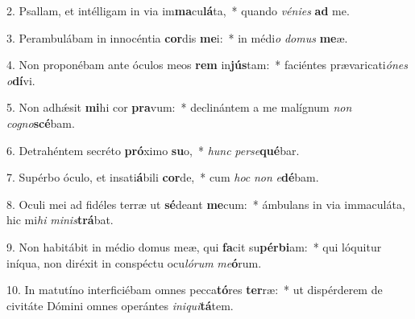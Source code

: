 2. Psallam, et intélligam in via im\textbf{ma}cu\textbf{lá}ta,~*  quando \textit{vé}\textit{ni}\textit{es} \textbf{ad} me.\

3. Perambulábam in innocéntia \textbf{cor}dis \textbf{me}i:~*  in médi\textit{o} \textit{do}\textit{mus} \textbf{me}æ.\

4. Non proponébam ante óculos meos \textbf{rem} in\textbf{jús}tam:~*  faciéntes prævaricati\textit{ó}\textit{nes} \textit{o}\textbf{dí}vi.\

5. Non adhǽsit \textbf{mi}hi cor \textbf{pra}vum:~*  declinántem a me malígnum \textit{non} \textit{co}\textit{gno}\textbf{scé}bam.\

6. Detrahéntem secréto \textbf{pró}ximo \textbf{su}o,~*  \textit{hunc} \textit{per}\textit{se}\textbf{qué}bar.\

7. Supérbo óculo, et insati\textbf{á}bili \textbf{cor}de,~*  cum \textit{hoc} \textit{non} \textit{e}\textbf{dé}bam.\

8. Oculi mei ad fidéles terræ ut \textbf{sé}deant \textbf{me}cum:~*  ámbulans in via immaculáta, hic mi\textit{hi} \textit{mi}\textit{nis}\textbf{trá}bat.\

9. Non habitábit in médio domus meæ, qui \textbf{fa}cit su\textbf{pér}\textbf{bi}am:~*  qui lóquitur iníqua, non diréxit in conspéctu ocu\textit{ló}\textit{rum} \textit{me}\textbf{ó}rum.\

10. In matutíno interficiébam omnes pecca\textbf{tó}res \textbf{ter}ræ:~*  ut dispérderem de civitáte Dómini omnes operántes \textit{in}\textit{i}\textit{qui}\textbf{tá}tem.\


